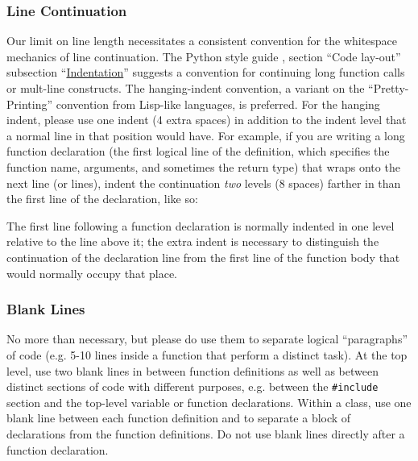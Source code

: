 \documentclass[12pt]{article}
\newcommand{\code}[1]{\texttt{#1}}
\begin{document}
\subsubsection{Line Continuation}
Our limit on line length necessitates a consistent convention for the whitespace mechanics of line continuation. The Python style guide \cite{pyguide}, section ``Code lay-out'' subsection ``\href{http://www.python.org/dev/peps/pep-0008/#indentation}{Indentation}'' suggests a convention for continuing long function calls or mult-line constructs. The hanging-indent convention, a variant on the ``Pretty-Printing'' convention from Lisp-like languages, is preferred. For the hanging indent, please use one indent (4 extra spaces) in addition to the indent level that a normal line in that position would have. For example, if you are writing a long function declaration (the first logical line of the definition, which specifies the function name, arguments, and sometimes the return type) that wraps onto the next line (or lines), indent the continuation \emph{two} levels (8 spaces) farther in than the first line of the declaration, like so:
\begin{codeex}
// Function declaration
VisionInterface:: VisionInterface(
        Matx33f cameraMat, Mat distCoeffs, Matx33f perspTrans,
        std::string camAddress) :
        cameraMat(cameraMat), distCoeffs(distCoeffs), perspTrans(perspTrans) {
    // Start of function body
    if (!source.open(camAddress)) {
    ...
\end{codeex}
The first line following a function declaration is normally indented in one level relative to the line above it; the extra indent is necessary to distinguish the continuation of the declaration line from the first line of the function body that would normally occupy that place.

\subsubsection{Blank Lines}
No more than necessary, but please do use them to separate logical ``paragraphs'' of code (e.g. 5-10 lines inside a function that perform a distinct task). At the top level, use two blank lines in between function definitions as well as between distinct sections of code with different purposes, e.g. between the \code{\#include} section and the top-level variable or function declarations. Within a class, use one blank line between each function definition and to separate a block of declarations from the function definitions. Do not use blank lines directly after a function declaration.
\end{document}
